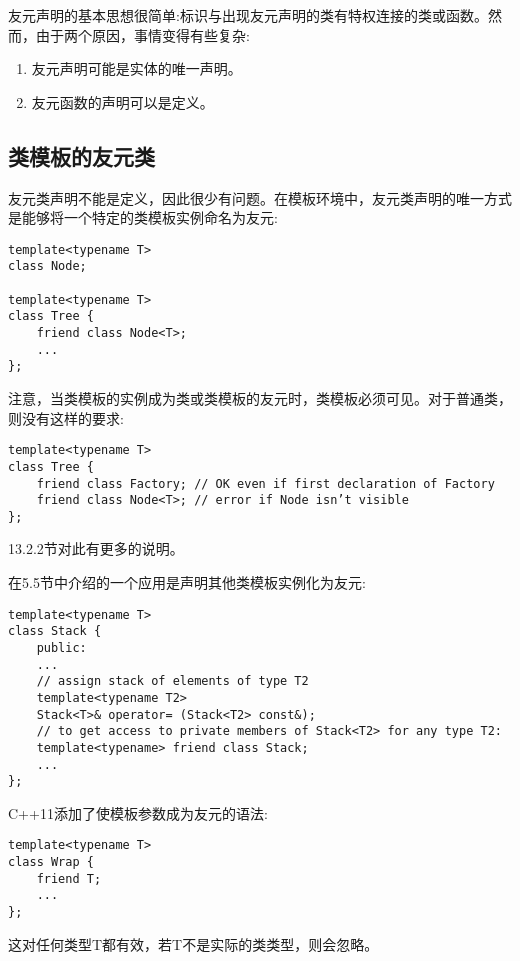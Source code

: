 
友元声明的基本思想很简单:标识与出现友元声明的类有特权连接的类或函数。然而，由于两个原因，事情变得有些复杂:

\begin{enumerate}
\item 
友元声明可能是实体的唯一声明。

\item 
友元函数的声明可以是定义。
\end{enumerate}

\subsection{类模板的友元类}

友元类声明不能是定义，因此很少有问题。在模板环境中，友元类声明的唯一方式是能够将一个特定的类模板实例命名为友元:

\begin{lstlisting}[style=styleCXX]
template<typename T>
class Node;

template<typename T>
class Tree {
	friend class Node<T>;
	...
};
\end{lstlisting}

注意，当类模板的实例成为类或类模板的友元时，类模板必须可见。对于普通类，则没有这样的要求:

\begin{lstlisting}[style=styleCXX]
template<typename T>
class Tree {
	friend class Factory; // OK even if first declaration of Factory
	friend class Node<T>; // error if Node isn’t visible
};
\end{lstlisting}

13.2.2节对此有更多的说明。

在5.5节中介绍的一个应用是声明其他类模板实例化为友元:

\begin{lstlisting}[style=styleCXX]
template<typename T>
class Stack {
	public:
	...
	// assign stack of elements of type T2
	template<typename T2>
	Stack<T>& operator= (Stack<T2> const&);
	// to get access to private members of Stack<T2> for any type T2:
	template<typename> friend class Stack;
	...
};
\end{lstlisting}

C++11添加了使模板参数成为友元的语法:

\begin{lstlisting}[style=styleCXX]
template<typename T>
class Wrap {
	friend T;
	...
};
\end{lstlisting}

这对任何类型T都有效，若T不是实际的类类型，则会忽略。

